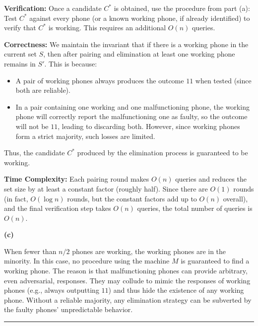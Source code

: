 \documentclass[11pt]{article}
\begin{document}
    \textbf{Verification:}  
    Once a candidate \(C^*\) is obtained, use the procedure from part (a): Test \(C^*\) against every phone (or a known working phone, if already identified) to verify that \(C^*\) is working. This requires an additional \(O(n)\) queries.
    
    \medskip
    
    \textbf{Correctness:}  
    We maintain the invariant that if there is a working phone in the current set \(S\), then after pairing and elimination at least one working phone remains in \(S'\). This is because:
    \begin{itemize}
        \item A pair of working phones always produces the outcome \(11\) when tested (since both are reliable).
        \item In a pair containing one working and one malfunctioning phone, the working phone will correctly report the malfunctioning one as faulty, so the outcome will not be \(11\), leading to discarding both. However, since working phones form a strict majority, such losses are limited.
    \end{itemize}
    Thus, the candidate \(C^*\) produced by the elimination process is guaranteed to be working. 
    
    \medskip
    
    \textbf{Time Complexity:}  
    Each pairing round makes \(O(n)\) queries and reduces the set size by at least a constant factor (roughly half). Since there are \(O(1)\) rounds (in fact, \(O(\log n)\) rounds, but the constant factors add up to \(O(n)\) overall), and the final verification step takes \(O(n)\) queries, the total number of queries is \(O(n)\).
    
    \bigskip
    
    \textbf{(c) }
    
    When fewer than \(n/2\) phones are working, the working phones are in the minority. In this case, no procedure using the machine \(M\) is guaranteed to find a working phone. The reason is that malfunctioning phones can provide arbitrary, even adversarial, responses. They may collude to mimic the responses of working phones (e.g., always outputting \(11\)) and thus hide the existence of any working phone. Without a reliable majority, any elimination strategy can be subverted by the faulty phones’ unpredictable behavior.
    
    \bigskip
    
    \par\noindent\rule{\textwidth}{0.4pt}
    
    
\end{document}
